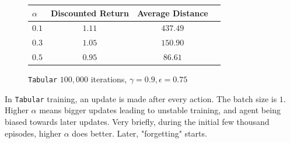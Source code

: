 \begin{figure}[H]
    \vspace{1em}
    \begin{minipage}{\linewidth}
    \centering
    \begin{tabular}{lccc}
        \hline
     $\alpha$ & Discounted Return & Average Distance \\
        \hline
    $0.1$ & $1.11$ & $437.49$ \\
    $0.3$ & $1.05$ & $150.90$ \\
    $0.5$ & $0.95$ & $86.61$ \\
        \hline
    \end{tabular}
    \caption{\texttt{Tabular} $100,000$ iterations, $\gamma = 0.9, \epsilon = 0.75$} 
    \end{minipage}
     \label{fig:part1-c}
\end{figure}
In \texttt{Tabular} training, an update is made after every action. The batch size is $1$. Higher $\alpha$ means bigger updates leading to unstable training, and agent being biased towards later updates. Very briefly, during the initial few thousand episodes, higher $\alpha$ does better. Later, "forgetting" starts.


